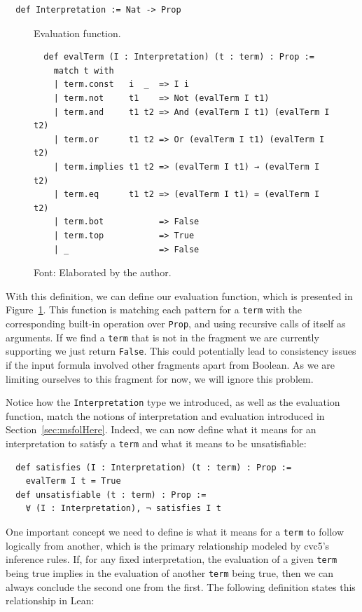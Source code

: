 \begin{verbatim}
  def Interpretation := Nat -> Prop
\end{verbatim}


\begin{figure}[t]
\caption{Evaluation function.}\label{evalTerm1}
\begin{verbatim}
  def evalTerm (I : Interpretation) (t : term) : Prop :=
    match t with
    | term.const   i  _  => I i
    | term.not     t1    => Not (evalTerm I t1)
    | term.and     t1 t2 => And (evalTerm I t1) (evalTerm I t2)
    | term.or      t1 t2 => Or (evalTerm I t1) (evalTerm I t2)
    | term.implies t1 t2 => (evalTerm I t1) → (evalTerm I t2)
    | term.eq      t1 t2 => (evalTerm I t1) = (evalTerm I t2)
    | term.bot           => False
    | term.top           => True
    | _                  => False
\end{verbatim}
\caption*{Font: Elaborated by the author.}
\end{figure}

With this definition, we can define our evaluation function, which is presented in
Figure~\ref{evalTerm1}.
This function is matching each pattern for a \texttt{term} with the corresponding built-in operation over \texttt{Prop}, and using recursive calls of itself as arguments. If we find a \texttt{term} that is not in the fragment we are currently supporting we just return \texttt{False}. This could potentially lead to consistency issues if the input formula involved other fragments apart from Boolean. As we are limiting ourselves to this fragment for now, we will ignore this problem.

Notice how the \texttt{Interpretation} type we introduced, as well as the evaluation function, match the notions of interpretation and evaluation introduced in Section~\ref{sec:msfolHere}. Indeed, we can now define what it means for an interpretation to satisfy a \texttt{term} and what it means to be unsatisfiable:

\begin{verbatim}
  def satisfies (I : Interpretation) (t : term) : Prop :=
    evalTerm I t = True
  def unsatisfiable (t : term) : Prop :=
    ∀ (I : Interpretation), ¬ satisfies I t
\end{verbatim}

One important concept we need to define is what it means for a \texttt{term}
to follow logically from another, which is the primary relationship modeled
by cvc5's inference rules.
%
If, for any fixed interpretation, the evaluation of a given \texttt{term} being true
implies in the evaluation of another \texttt{term} being true, then we can always
conclude the second one from the first. The following definition states this
relationship in Lean:

